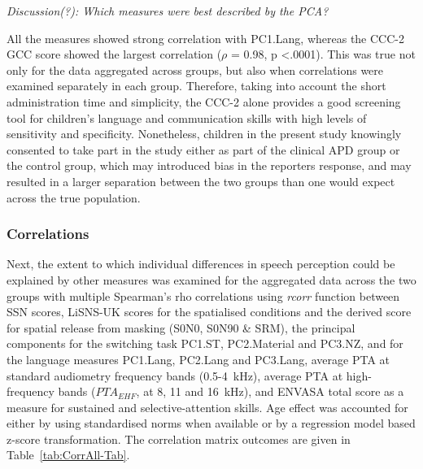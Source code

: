 \documentclass[a4paper, twoside]{templates/ociamthesis}
\begin{document}
\begin{correction}
\emph{Discussion(?): Which measures were best described by the PCA?}

All the measures showed strong correlation with PC1.Lang, whereas the
CCC-2 GCC score showed the largest correlation (\(\rho\) = 0.98, p
\textless.0001). This was true not only for the data aggregated across
groups, but also when correlations were examined separately in each
group. Therefore, taking into account the short administration time and
simplicity, the CCC-2 alone provides a good screening tool for
children's language and communication skills with high levels of
sensitivity and specificity. Nonetheless, children in the present study
knowingly consented to take part in the study either as part of the
clinical APD group or the control group, which may introduced bias in
the reporters response, and may resulted in a larger separation between
the two groups than one would expect across the true population.
\end{correction}

\hypertarget{correlations}{%
\subsubsection{Correlations}\label{correlations}}

Next, the extent to which individual differences in speech perception could be explained by other measures was examined for the aggregated data across the two groups with multiple Spearman's rho correlations using \emph{rcorr} function \autocite[Hmisc R package;][]{HmiscPackageR} between SSN scores, LiSNS-UK scores for the spatialised conditions and the derived score for spatial release from masking (S0N0, S0N90 \& SRM), the principal components for the switching task PC1.ST, PC2.Material and PC3.NZ, and for the language measures PC1.Lang, PC2.Lang and PC3.Lang, average PTA at standard audiometry frequency bands (0.5-4~kHz), average PTA at high-frequency bands (\(PTA_{EHF}\), at 8, 11 and 16~kHz), and ENVASA total score as a measure for sustained and selective-attention skills. Age effect was accounted for either by using standardised norms when available or by a regression model based z-score transformation. The correlation matrix outcomes are given in Table~\ref{tab:CorrAll-Tab}.\\
\end{document}
